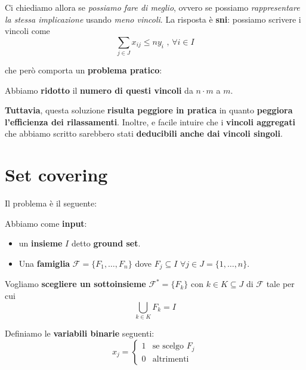 Ci chiediamo allora se \textit{possiamo fare di meglio}, ovvero
se possiamo \textit{rappresentare la stessa implicazione}
usando \textit{meno vincoli}.
La risposta è \textbf{sni}: possiamo scrivere i vincoli come
\[
    \sum_{j\in J} x_{ij} \le ny_i \text{ , } \forall i \in I
\]

che però comporta un \textbf{problema pratico}:

\begin{remark}[COMPROMESSO]
    Abbiamo \textbf{ridotto} il \textbf{numero di questi vincoli} 
    da $n \cdot m$ a $m$.

    \textbf{Tuttavia}, questa soluzione \textbf{risulta peggiore in pratica}
    in quanto \textbf{peggiora l'efficienza dei rilassamenti}. 
    Inoltre, e facile intuire che i \textbf{vincoli aggregati} che
    abbiamo scritto sarebbero stati \textbf{deducibili anche dai vincoli singoli}.
\end{remark}

\section{Set covering}

Il problema è il seguente:

\begin{exa}
    Abbiamo come \textbf{input}:
    \begin{itemize}
        \item un \textbf{insieme} $I$ detto \textbf{ground set}.
        \item Una \textbf{famiglia} $\mathcal{F} = \{ F_{1}, \ldots , F_n\}$ 
            dove $F_j \subseteq I$ $\forall j \in J = \{1,\ldots ,n\}  $.
    \end{itemize}
    Vogliamo \textbf{scegliere un sottoinsieme} $\mathcal{F}^* = \{F_k\}$ 
    con $k \in K \subseteq J$ di $\mathcal{F}$ tale per cui
    \[
        \bigcup_{k \in K} F_k = I
    \] 
\end{exa}

Definiamo le \textbf{variabili binarie} seguenti:
\[
    x_j = \begin{cases}
        1 & \text{se scelgo } F_j \\ 
        0 & \text{altrimenti}
    \end{cases}
\]

